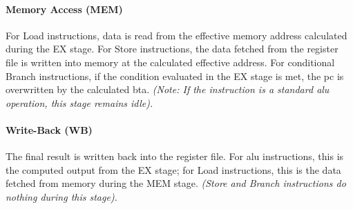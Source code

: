 \paragraph{Memory Access (MEM)} 
For Load instructions, data is read from the effective memory address calculated during the EX stage. For Store instructions, the data fetched from the register file is written into memory at the calculated effective address. For conditional Branch instructions, if the condition evaluated in the EX stage is met, the \gls{pc} is overwritten by the calculated \gls{bta}. \textit{(Note: If the instruction is a standard \gls{alu} operation, this stage remains idle).}

\paragraph{Write-Back (WB)} 
The final result is written back into the register file. For \gls{alu} instructions, this is the computed output from the EX stage; for Load instructions, this is the data fetched from memory during the MEM stage. \textit{(Store and Branch instructions do nothing during this stage).}

